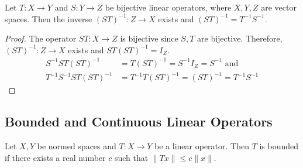 \begin{theorem}
	Let $T : X \to Y$ and $S : Y \to Z$ be bijective linear operators, where $X,Y,Z$ are vector spaces.
	Then the inverse $(ST)^{-1} :Z \to X$ exists and $(ST)^{-1} = T^{-1}S^{-1}$.
\end{theorem}
\begin{proof}
	The operator $ST : X \to Z$ is bijective since $S,T$ are bijective.
	Therefore, $(ST)^{-1} : Z \to X$ exists and $ST(ST)^{-1} = I_Z$.
	\begin{align*}
		S^{-1}ST(ST)^{-1} & = T(ST)^{-1} = S^{-1}I_Z = S^{-1} \text{ and} \\
		T^{-1}S^{-1}ST(ST)^{-1} & = T^{-1}T(ST)^{-1} = (ST)^{-1} = T^{-1}S^{-1}
	\end{align*}
\end{proof}

\subsection{Bounded and Continuous Linear Operators}
\begin{definition}
	Let $X,Y$ be normed spaces and $T:X \to Y$ be a linear operator.
	Then $T$ is bounded if there exists a real number $c$ such that $\|Tx\| \le c\|x\|$.
\end{definition}


